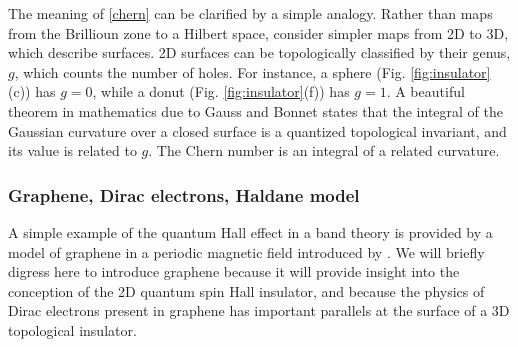 \documentclass[twocolumn,floatfix,showpacs,rmp,aps]{revtex4}
\begin{document}



The meaning of \eqref{chern} can be clarified by a simple analogy.  Rather than
maps from the Brillioun zone to a Hilbert
space, consider simpler maps from 2D to 3D, which describe surfaces.  2D surfaces can be
topologically classified by their genus, $g$, which counts the number of
holes.  For instance, a sphere (Fig. \ref{fig:insulator}(c)) has $g=0$,
while a donut (Fig. \ref{fig:insulator}(f)) has $g=1$.
A beautiful theorem in mathematics due to Gauss and Bonnet \cite{nakahara90} states
that the integral of the Gaussian
curvature over a closed surface is a quantized topological invariant, and
its value is related to $g$.  The Chern number is an integral
of a related curvature.


\subsubsection{Graphene, Dirac electrons, Haldane model}
\label{sec:dirac}

A simple example of the quantum Hall effect in a band theory
is provided by a  model of graphene in a
periodic magnetic field introduced by \textcite{haldane88}.  We will briefly digress
here to introduce graphene because it will provide insight into the conception of the
2D quantum spin Hall insulator, and because the physics of Dirac electrons
present in graphene has important parallels at the surface of a 3D topological insulator.
\end{document}
